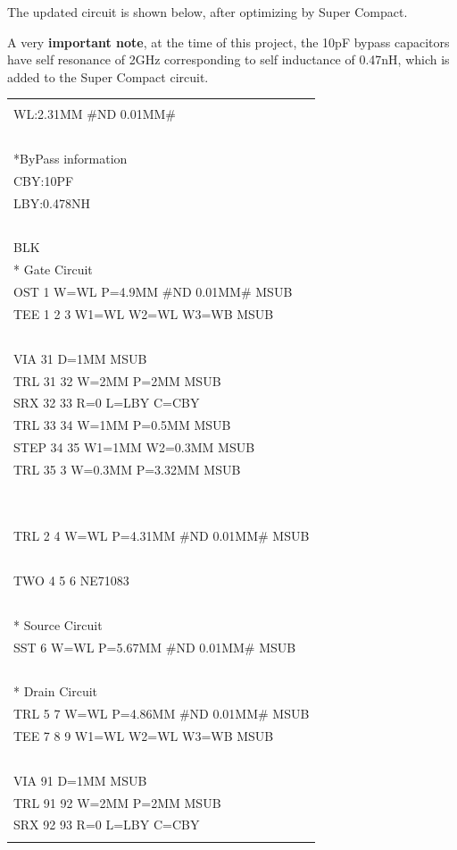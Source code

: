The updated circuit is shown below, after optimizing by Super Compact.

A very \textbf{important note}, at the time of this project, the 10pF
bypass capacitors have self resonance of 2GHz corresponding to self
inductance of 0.47nH, which is added to the Super Compact circuit.

\begin{longtable}[]{@{}l@{}}
\toprule
\endhead
\begin{minipage}[t]{0.97\columnwidth}\raggedright
\begin{quote}
WB:0.3MM \#ND 0.01MM\#\\
WL:2.31MM \#ND 0.01MM\#\\
~\\
*ByPass information\\
CBY:10PF\\
LBY:0.478NH\\
~\\
BLK\\
* Gate Circuit\\
OST 1 W=WL P=4.9MM \#ND 0.01MM\# MSUB\\
TEE 1 2 3 W1=WL W2=WL W3=WB MSUB\\
~\\
VIA 31 D=1MM MSUB\\
TRL 31 32 W=2MM P=2MM MSUB\\
SRX 32 33 R=0 L=LBY C=CBY\\
TRL 33 34 W=1MM P=0.5MM MSUB\\
STEP 34 35 W1=1MM W2=0.3MM MSUB\\
TRL 35 3 W=0.3MM P=3.32MM MSUB\\
~\\
~\\
TRL 2 4 W=WL P=4.31MM \#ND 0.01MM\# MSUB\\
~\\
TWO 4 5 6 NE71083\\
~\\
* Source Circuit\\
SST 6 W=WL P=5.67MM \#ND 0.01MM\# MSUB\\
~\\
* Drain Circuit\\
TRL 5 7 W=WL P=4.86MM \#ND 0.01MM\# MSUB\\
TEE 7 8 9 W1=WL W2=WL W3=WB MSUB\\
~\\
VIA 91 D=1MM MSUB\\
TRL 91 92 W=2MM P=2MM MSUB\\
SRX 92 93 R=0 L=LBY C=CBY\\

\end{quote}
\end{minipage}
\end{longtable}
